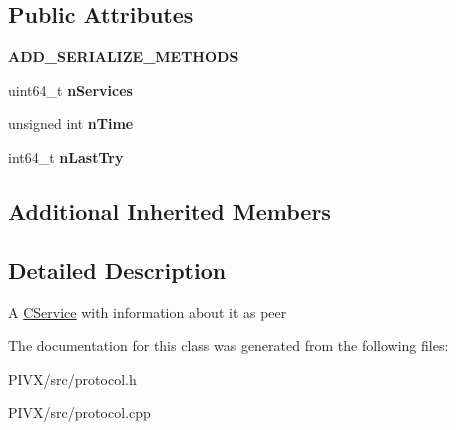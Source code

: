 \subsection*{Public Attributes}
\begin{DoxyCompactItemize}
\item 
\mbox{\label{class_c_address_a9582fc22433b2ed275d4b65fb72551e7}} 
{\bfseries A\+D\+D\+\_\+\+S\+E\+R\+I\+A\+L\+I\+Z\+E\+\_\+\+M\+E\+T\+H\+O\+DS}
\item 
\mbox{\label{class_c_address_a6a4a6aa020d0d558f238c7d04dd986c3}} 
uint64\+\_\+t {\bfseries n\+Services}
\item 
\mbox{\label{class_c_address_ac1c44aac968b11f90ce529b133ae4e9b}} 
unsigned int {\bfseries n\+Time}
\item 
\mbox{\label{class_c_address_abcf198429efe135fa2424f7dbc0048b0}} 
int64\+\_\+t {\bfseries n\+Last\+Try}
\end{DoxyCompactItemize}
\subsection*{Additional Inherited Members}


\subsection{Detailed Description}
A \mbox{\hyperlink{class_c_service}{C\+Service}} with information about it as peer 

The documentation for this class was generated from the following files\+:\begin{DoxyCompactItemize}
\item 
P\+I\+V\+X/src/protocol.\+h\item 
P\+I\+V\+X/src/protocol.\+cpp\end{DoxyCompactItemize}
